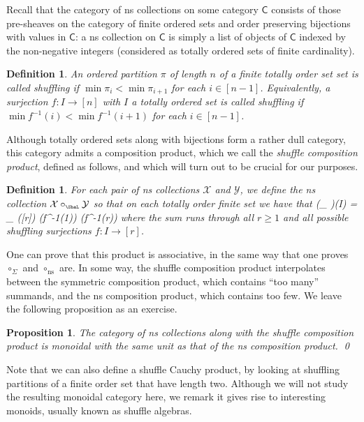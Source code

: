 \documentclass[fleqn, a4paper, twoside]{article}
\makeatletter
\newcommand{\Sha}{{\scaleobj{0.75}{\ShaL}}}
\newcommand{\0}{\langle 0\rangle}
\newcommand{\XX}{\mathcal{X}}
\newcommand{\YY}{\mathcal{Y}}
\let\[\@undefined
\DeclareRobustCommand{\[}{\begin{equation}}%
\let\]\@undefined
\DeclareRobustCommand{\]}{\end{equation}}%
\theoremstyle{mytheorem}
\newtheorem{proposition}[theorem]{Proposition}
\theoremstyle{introthm}
\theoremstyle{mydefinition}
\newtheorem{definition}[theorem]{Definition}
\theoremstyle{mydefinition2}
\theoremstyle{plain} %
\newcommand{\?}{\,?\,}
\theoremstyle{mytheorem}
\theoremstyle{plain} %
\makeatother
\begin{document}
Recall that the category of ns collections
on some category $\mathsf{C}$ 
consists of those pre-sheaves on
the category of finite ordered sets
and order preserving bijections with
values in $\mathsf{C}$: a ns collection
on $\mathsf{C}$ is simply a list of
objects of $\mathsf{C}$ indexed by
the non-negative integers (considered
as totally ordered sets of finite 
cardinality). 

\begin{definition}
An ordered partition $\pi$ of length $n$
of a finite totally order set
set is called \emph{shuffling} if
$\min \pi_i < \min \pi_{i+1}$ for
each $i\in [n-1]$. Equivalently, 
a surjection $f:I\longrightarrow [n]$
with $I$ a totally ordered set
is called \emph{shuffling} if
$\min f^{-1}(i) < \min f^{-1}(i+1)$
for each $i\in [n-1]$.
\end{definition}

Although totally ordered
sets along with bijections form a rather
dull category, this category
admits a composition product, which we call
the \emph{shuffle composition product},
defined as follows, and which will turn
out to be crucial for our purposes.

\begin{definition}
For each pair of ns collections $\XX$
and $\YY$, we define the ns collection
$\XX\circ_{\Sha} \YY$ so that on each
totally order finite set we have that 
\[
(\XX\circ_{\Sha} \YY)(I)
	=
	 \bigoplus_{}
	 \XX([r])\otimes 
	 \YY(f^{-1}(1))
	 	\otimes
	 		\cdots
	 			\otimes
	 				\YY(f^{-1}(r))
\]
where the sum runs through all $r\geqslant 1$
and all possible 
shuffling surjections 
$f : I \longrightarrow [r]$.
\end{definition}

One can prove that this product is
associative, in the same way that one
proves $\circ_\Sigma$ and $\circ_\mathrm{ns}$
are. In some way, the shuffle composition
product interpolates between the symmetric
composition product, which contains ``too
many'' summands, and the ns composition
product, which contains too few. We
leave the following proposition as an exercise.

\begin{proposition}
The category of ns collections along with
the shuffle composition product is 
monoidal with the same unit as that of the
ns composition product. \qed
\end{proposition}

Note that we can also define a shuffle
Cauchy product, by looking at shuffling
partitions of a finite order set that
have length two. Although we will not study
the resulting monoidal category here,
we remark it gives rise to interesting
monoids, usually known as shuffle algebras.
\end{document}
